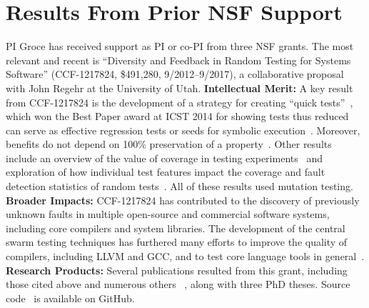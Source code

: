 \section{Results From Prior NSF Support}

PI Groce has received support as PI or co-PI from three NSF grants.
The most relevant and recent is ``Diversity and Feedback in Random
Testing for Systems Software'' (CCF-1217824,
\$491,280, 9/2012--9/2017), a collaborative proposal with John Regehr at the
University of Utah.
{\bf Intellectual Merit:} 
A key result from CCF-1217824
is the development of a strategy for creating ``quick tests''~\cite{icst2014}, which won the
Best Paper award at ICST 2014 for showing tests thus
reduced can serve as effective regression tests or seeds for
symbolic execution~\cite{stvrcausereduce, issta14}.  Moreover, benefits do not depend on 100\%
preservation of a property~\cite{AlipourETAL16TestReduction}.   Other results include an overview of the value of coverage in
testing experiments~\cite{Onward14} and exploration of how individual
test features impact the coverage and fault detection statistics of
random tests~\cite{helphelp}.  
All of these results used
mutation testing.  {\bf Broader Impacts:} CCF-1217824 has contributed to the discovery of previously
unknown faults in multiple open-source and commercial software
systems, including core compilers and system libraries.  The
development of the central swarm testing techniques
has furthered many efforts to improve
the quality of compilers, including LLVM and GCC, and to test core language
tools in
general~\cite{ZhendongPLDI14,beginnerluck,dewey2015fuzzing,le2015randomized}. {\bf
  Research
Products:} Several publications resulted from this grant, including
those cited above and numerous others ~\cite{Onward14,PLDI13,issta14,icst2014,helphelp,DirectedSwarm,stvrcausereduce,tstlsttt,ISSTA15,AlipourETAL16TestReduction,tstlsttt,NFM15},
along with three PhD theses.  Source code~\cite{swarmtools,TSTL}  is
available on GitHub.
